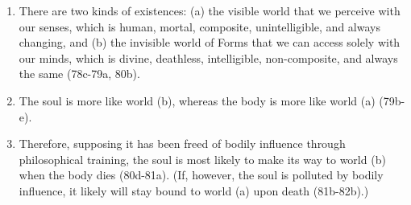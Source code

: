 \documentclass[]{article}
\begin{document}
\begin{enumerate}
\def\labelenumi{\arabic{enumi}.}
\item
  There are two kinds of existences: (a) the visible world that we
  perceive with our senses, which is human, mortal, composite,
  unintelligible, and always changing, and (b) the invisible world of
  Forms that we can access solely with our minds, which is divine,
  deathless, intelligible, non-composite, and always the same (78c-79a,
  80b).
\item
  The soul is more like world (b), whereas the body is more like world
  (a) (79b-e).
\item
  Therefore, supposing it has been freed of bodily influence through
  philosophical training, the soul is most likely to make its way to
  world (b) when the body dies (80d-81a). (If, however, the soul is
  polluted by bodily influence, it likely will stay bound to world (a)
  upon death (81b-82b).)
\end{enumerate}
\end{document}
